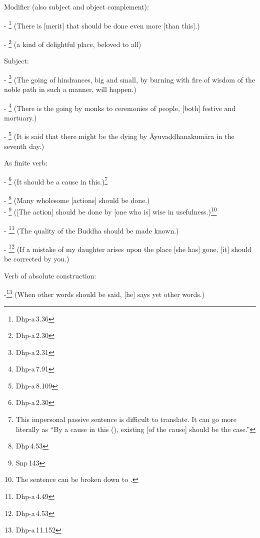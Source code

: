 \begin{compactenum}[(1)]
\item Modifier (also subject and object complement):\par
- \footnote{Dhp-a\,3.36} (There is [merit] that should be done even more [than this].)\par
- \footnote{Dhp-a\,2.30} (a kind of delightful place, beloved to all)\par

\item Subject:\par
- \footnote{Dhp-a\,2.31} (The going of hindrances, big and small, by burning with fire of wisdom of the noble path in such a manner, will happen.)\par
- \footnote{Dhp-a\,7.91} (There is the going by monks to ceremonies of people, [both] festive and mortuary.)\par
- \footnote{Dhp-a\,8.109} (It is said that there might be the dying by \=Ayuva\d d\d dhanakum\=ara in the seventh day.)\par

\item As finite verb:\par
- \footnote{Dhp-a\,2.30} (It should be a cause in this.)\footnote{This impersonal passive sentence is difficult to translate. It can go more literally as ``By a cause in this (), existing [of the cause] should be the case.''}\par
- \footnote{Dhp\,4.53} (Many wholesome [actions] should be done.)\\[1.5mm]
- \footnote{Snp\,143} ([The action] should be done by [one who is] wise in usefulness.)\footnote{The sentence can be broken down to .}\par
- \footnote{Dhp-a\,4.49} (The quality of the Buddha should be made known.)\par
- \footnote{Dhp-a\,4.53} (If a mistake of my daughter arises upon the place [she has] gone, [it] should be corrected by you.)\par

\item Verb of absolute construction:\par
-\footnote{Dhp-a\,11.152} (When other words should be said, [he] says yet other words.)\par
\end{compactenum}

